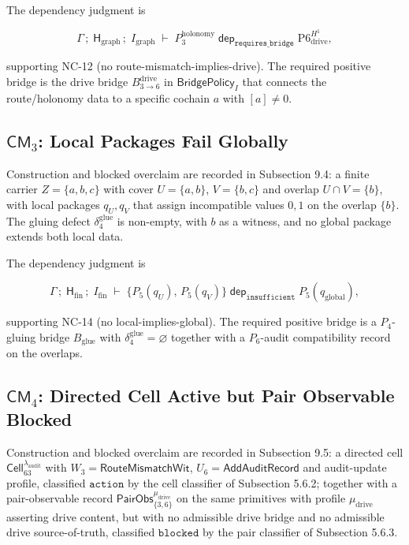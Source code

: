 \documentclass[11pt]{article}
\theoremstyle{definition}
\begin{document}
The dependency judgment is

\[
\Gamma\,;\;\mathsf H_{\mathrm{graph}}\,;\;I_{\mathrm{graph}}\;\vdash\;P_3^{\mathrm{holonomy}}\;\mathrel{\mathsf{dep}_{\texttt{requires\_bridge}}}\;\mathrm{P6}_{\mathrm{drive}}^{H^1},
\]

supporting NC-12 (no route-mismatch-implies-drive). The required positive bridge is the drive bridge \(B_{3\to 6}^{\mathrm{drive}}\) in \(\mathsf{BridgePolicy}_I\) that connects the route/holonomy data to a specific cochain \(a\) with \([a]\neq 0\).

\subsection{\texorpdfstring{\(\mathsf{CM}_3\): Local Packages Fail Globally}{C.4 \textbackslash mathsf\{CM\}\_3: Local Packages Fail Globally}}

Construction and blocked overclaim are recorded in Subsection 9.4: a finite carrier \(Z=\{a,b,c\}\) with cover \(U=\{a,b\}\), \(V=\{b,c\}\) and overlap \(U\cap V=\{b\}\), with local packages \(q_U,q_V\) that assign incompatible values \(0,1\) on the overlap \(\{b\}\). The gluing defect \(\delta_4^{\mathrm{glue}}\) is non-empty, with \(b\) as a witness, and no global package extends both local data.

The dependency judgment is

\[
\Gamma\,;\;\mathsf H_{\mathrm{fin}}\,;\;I_{\mathrm{fin}}\;\vdash\;\bigl\{P_5(q_U),\,P_5(q_V)\bigr\}\;\mathrel{\mathsf{dep}_{\texttt{insufficient}}}\;P_5(q_{\mathrm{global}}),
\]

supporting NC-14 (no local-implies-global). The required positive bridge is a \(P_4\)-gluing bridge \(B_{\mathrm{glue}}\) with \(\delta_4^{\mathrm{glue}}=\varnothing\) together with a \(P_6\)-audit compatibility record on the overlaps.

\subsection{\texorpdfstring{\(\mathsf{CM}_4\): Directed Cell Active but Pair Observable Blocked}{C.5 \textbackslash mathsf\{CM\}\_4: Directed Cell Active but Pair Observable Blocked}}

Construction and blocked overclaim are recorded in Subsection 9.5: a directed cell \(\mathsf{Cell}_{63}^{\lambda_{\mathrm{audit}}}\) with \(W_3=\mathsf{RouteMismatchWit}\), \(U_6=\mathsf{AddAuditRecord}\) and audit-update profile, classified \(\texttt{action}\) by the cell classifier of Subsection 5.6.2; together with a pair-observable record \(\mathsf{PairObs}_{\{3,6\}}^{\mu_{\mathrm{drive}}}\) on the same primitives with profile \(\mu_{\mathrm{drive}}\) asserting drive content, but with no admissible drive bridge and no admissible drive source-of-truth, classified \(\texttt{blocked}\) by the pair classifier of Subsection 5.6.3.
\end{document}
